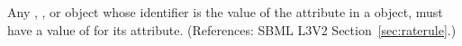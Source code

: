 Any \Compartment, \Species, \Parameter or \SpeciesReference object whose
identifier is the value of the attribute  in a \RateRule
object, must have a value of  for its 
attribute.  (References: SBML L3V2 Section~\ref{sec:raterule}.)
